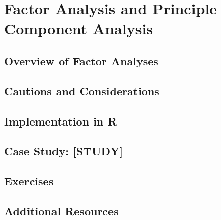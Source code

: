 
\chapter{Factor Analysis and Principle Component Analysis}

\section{Overview of Factor Analyses}

\section{Cautions and Considerations}

\section{Implementation in R}

\section{Case Study: [STUDY]}

\section{Exercises}

\section{Additional Resources}

